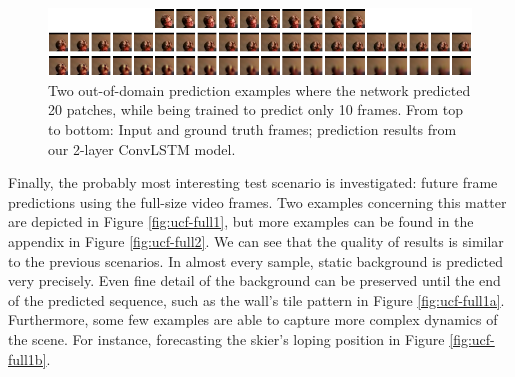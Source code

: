 \begin{figure}[htpb]
	\centering
	\includegraphics[width=1.0\linewidth]{figures/pred/ucf/long/pred-01.png} 
	\caption[Out-of-Domain Prediction Samples on UCF-101]{Two out-of-domain prediction examples where the network predicted 20 patches, while being trained to predict only 10 frames. From top to bottom: Input and ground truth frames; prediction results from our 2-layer ConvLSTM model.} \label{fig:ucf-long1}
\end{figure}

Finally, the probably most interesting test scenario is investigated: future frame predictions using the full-size video frames. Two examples concerning this matter are depicted in Figure \ref{fig:ucf-full1}, but more examples can be found in the appendix in Figure \ref{fig:ucf-full2}. We can see that the quality of results is similar to the previous scenarios. In almost every sample, static background is predicted very precisely. Even fine detail of the background can be preserved until the end of the predicted sequence, such as the wall's tile pattern in Figure \ref{fig:ucf-full1a}. Furthermore, some few examples are able to capture more complex dynamics of the scene. For instance, forecasting the skier's loping position in Figure \ref{fig:ucf-full1b}.

